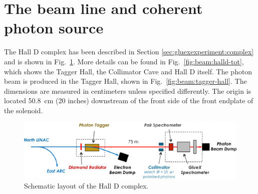 
\section[The beam line and coherent photon source (Stuart)]{The beam line and coherent photon source \label{sec:beamline}}



The Hall D complex has been described in Section \ref{sec:gluexexperiment:complex} and is shown in Fig.~\ref{fig:beam:schematic}.
More details can be found in Fig.~\ref{fig:beam:halld-tot}, which shows the Tagger Hall, the Collimator Cave and Hall D itself.
The photon beam is produced in the Tagger Hall, shown in Fig.~\ref{fig:beam:tagger-hall}.
The dimensions are measured in centimeters unless specified differently.
The origin is located 50.8~cm (20 inches) downstream of the front side of the front endplate of the solenoid.

\begin{figure}[t]
\begin{center}
   \includegraphics[clip=true,width=0.98\linewidth]{figures/gx_beamline_0}
\end{center}
\caption{Schematic layout of the Hall D complex.
        }
\label{fig:beam:schematic} 
\end{figure}


